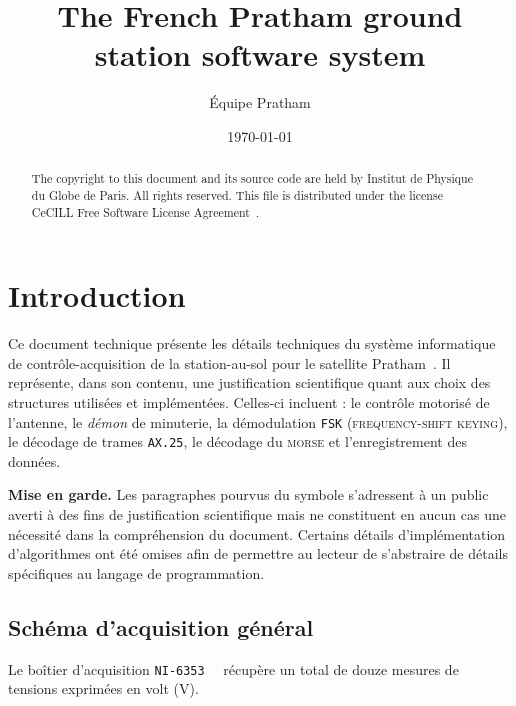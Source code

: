 \documentclass[twocolumn,pre,floats,aps,amsmath,amssymb]{revtex4}
\begin{document}
\title{The French Pratham ground station software system}
\author{\'Equipe Pratham}
\date{\today}

\begin{abstract}
  The copyright to this document and its source code are held by Institut de Physique du Globe de Paris. All rights reserved. This file is distributed under the license CeCILL Free Software License Agreement~\cite{cecill}.
\end{abstract}

\maketitle

\section{Introduction}
\label{sec:intro}

Ce document technique pr\'esente les d\'etails techniques du syst\`eme informatique de contr\^ole-acquisition de la station-au-sol pour le satellite Pratham~\cite{IITB_general}. Il repr\'esente, dans son contenu, une justification scientifique quant aux choix des structures utilis\'ees et impl\'ement\'ees. Celles-ci incluent : le contr\^ole motoris\'e de l'antenne, le \textit{d\'emon} de minuterie, la d\'emodulation \texttt{FSK} (\textsc{frequency-shift keying}), le d\'ecodage de trames \texttt{AX.25}, le d\'ecodage du \textsc{morse} et l'enregistrement des donn\'ees.

\textbf{Mise en garde.} Les paragraphes pourvus du symbole { \color{rltred}{\Radioactivity} } s'adressent \`a un public averti \`a des fins de justification scientifique mais ne constituent en aucun cas une n\'ecessit\'e dans la compr\'ehension du document. Certains d\'etails d'impl\'ementation d'algorithmes ont \'et\'e omises afin de permettre au lecteur de s'abstraire de d\'etails sp\'ecifiques au langage de programmation.

\subsection{Sch\'ema d'acquisition g\'en\'eral}

Le bo\^itier d'acquisition \texttt{NI-6353}~\cite{NI_6353_datasheet}~\cite{NI_calibration_procedure} r\'ecup\`ere un total de douze mesures de tensions exprim\'ees en volt (V).
\end{document}
